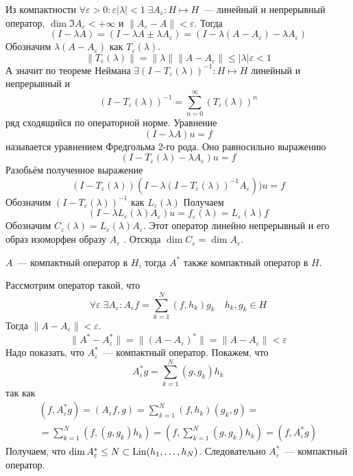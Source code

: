 \documentclass[14pt]{extarticle}
\begin{document}
Из компактности $\forall \varepsilon > 0\colon \varepsilon|\lambda| < 1\;
\exists A_\varepsilon : H \mapsto H$~--- линейный и непрерывный оператор,
$\dim \Im A_\varepsilon < + \infty$ и $\|A_\varepsilon - A \| < \varepsilon$.
Тогда
$$
(I - \lambda A) = (I - \lambda A \pm \lambda A_\varepsilon) = (I - 
\lambda(A - A_\varepsilon) - \lambda A_\varepsilon)
$$
Обозначим $\lambda(A - A_\varepsilon)$ как $T_\varepsilon(\lambda)$.
$$
\|T_\varepsilon(\lambda)\| = \|\lambda\|\|A - A_\varepsilon\| \le |\lambda|
\varepsilon < 1
$$
А значит по теореме Неймана $\exists (I - T_\varepsilon(\lambda))^{-1} : H 
\mapsto H$ линейный и непрерывный и
$$
(I - T_\varepsilon(\lambda))^{-1} = \sum\limits_{n = 0}^\infty(T_\varepsilon
(\lambda))^n
$$
ряд сходящийся по операторной норме.
Уравнение
$$
(I - \lambda A)u = f
$$
называется уравнением Фредгольма 2-го рода.
Оно равносильно выражению
$$
(I - T_\varepsilon(\lambda) - \lambda A_\varepsilon)u = f
$$
Разобьём полученное выражение
$$
(I - T_\varepsilon(\lambda))(I - \lambda(I - T_\varepsilon(\lambda))^{-1}
A_\varepsilon))u = f
$$
Обозначим $(I - T_\varepsilon(\lambda))^{-1}$ как $L_\varepsilon(\lambda)$
Получаем
$$
(I - \lambda L_\varepsilon(\lambda) A_\varepsilon)u = f_\varepsilon(\lambda)
= L_\varepsilon(\lambda) f
$$
Обозначим $C_\varepsilon(\lambda) = L_\varepsilon(\lambda)A_\varepsilon$.
Этот оператор линейно непрерывный и его образ изоморфен образу $A_\varepsilon$
.
Отсюда $\dim C_\varepsilon = \dim A_\varepsilon$.
\begin{Utv}
    $A$~--- компактный оператор в $H$, тогда $A^*$ также компактный оператор в
    $H$.
\end{Utv}
\begin{Proof}
    Рассмотрим оператор такой, что
    $$
    \forall \varepsilon\; \exists A_\varepsilon\colon 
    A_\varepsilon f = \sum\limits_{k = 1}^N(f, h_k)g_k\quad h_k,g_k \in H
    $$
    Тогда $\|A - A_\varepsilon\| < \varepsilon$.
    $$
    \|A^* - A_\varepsilon^*\| = \|(A - A_\varepsilon)^*\| = 
    \|A - A_\varepsilon\| < \varepsilon
    $$
    Надо показать, что $A_\varepsilon^*$~--- компактный оператор.
    Покажем, что
    $$
    A_\varepsilon^* g = \sum\limits_{k = 1}^N(g, g_k)h_k
    $$
    так как
    \begin{multline*}
    (f, A_\varepsilon^* g) = (A_\varepsilon f, g) = \sum\limits_{k = 1}^{N}
    (f, h_k)(g_k, g) =\\= \sum\limits_{k = 1}^N (f, (g, g_k)h_k) = (f, \sum
    \limits_{k = 1}^N(g, g_k)h_k) = (f, A_\varepsilon^* g)
    \end{multline*}
    Получаем, что $\dim A_\varepsilon^* \le N \subset \operatorname{Lin}(h_1,\dots, h_N)$.
    Следовательно $A_\varepsilon^*$~--- компактный оператор.
\end{Proof}
\end{document}
